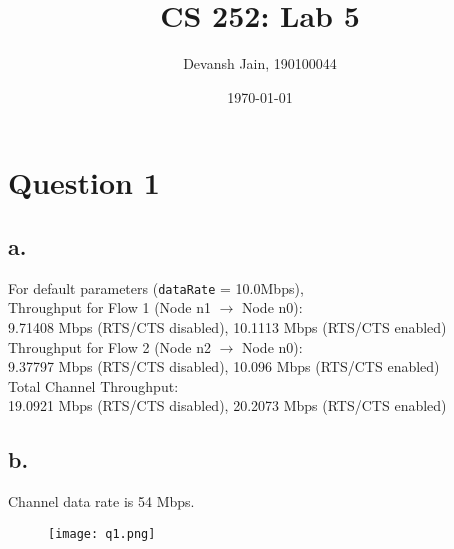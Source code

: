 \documentclass[11pt, fleqn]{article}
\title{\vspace{-4em}CS 252: Lab 5}
\author{Devansh Jain, 190100044}
\date{\today}
\begin{document}
\maketitle
\tableofcontents
\thispagestyle{empty}
\setcounter{page}{0}


\newpage 
\section*{Question 1}
\setcounter{equation}{0}

\subsection*{a.}

For default parameters (\texttt{dataRate} = 10.0Mbps),\\

Throughput for Flow 1 (Node n1 $\rightarrow$ Node n0): \\
9.71408 Mbps (RTS/CTS disabled), 10.1113 Mbps (RTS/CTS enabled) \\

Throughput for Flow 2 (Node n2 $\rightarrow$ Node n0): \\
9.37797 Mbps (RTS/CTS disabled), 10.096 Mbps (RTS/CTS enabled) \\

Total Channel Throughput: \\
19.0921 Mbps (RTS/CTS disabled), 20.2073 Mbps (RTS/CTS enabled) \\

\subsection*{b.}

Channel data rate is 54 Mbps.

\begin{figure}[H]
    \centering
    \texttt{[image: q1.png]}
\end{figure}
\end{document}
